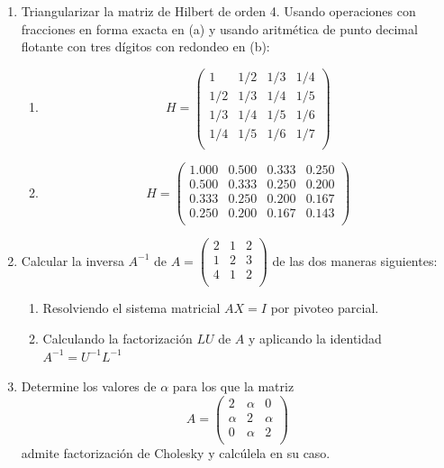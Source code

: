 \documentclass[12pt,letterpaper]{article}
\theoremstyle{plain}
\begin{document}
\begin{enumerate}
\item Triangularizar la matriz de Hilbert de orden 4. Usando operaciones con fracciones en forma exacta en (a) y usando aritm\'etica de punto decimal flotante con tres d\'igitos con redondeo en (b):
\begin{multicols}{2}
\begin{enumerate}
 \item $$
H=\left( \begin{array}{cccc}
         1   & 1/2 & 1/3 & 1/4\\
         1/2 & 1/3 & 1/4 & 1/5\\
         1/3 & 1/4 & 1/5 & 1/6\\
	 1/4 & 1/5 & 1/6 & 1/7\\
        \end{array}\right)
$$
\item $$
H=\left( \begin{array}{cccc}
         1.000   & 0.500 & 0.333 & 0.250\\
         0.500 & 0.333 & 0.250 & 0.200\\
         0.333 & 0.250 & 0.200 & 0.167\\
	 0.250 & 0.200 & 0.167 & 0.143\\
        \end{array}\right)
$$
 \end{enumerate}
\end{multicols}
\item Calcular la inversa $A^{-1}$ de $A=
\left( \begin{array}{ccc}
         2   & 1 & 2 \\
         1 & 2 & 3\\
         4 & 1 & 2\\
        \end{array}\right)
$ de las dos maneras siguientes:
\begin{enumerate}
\item Resolviendo el sistema matricial $AX = I$ por pivoteo parcial.
\item Calculando la factorizaci\'on $LU$ de $A$ y aplicando la identidad $A^{-1} = U ^{-1}L^{-1}$

\end{enumerate}
\item Determine los valores de $\alpha$ para los que la matriz
$$
A=\left( \begin{array}{ccc}
         2   & \alpha & 0\\
         \alpha & 2 & \alpha\\
         0 & \alpha & 2\\
        \end{array}\right)
$$
admite factorizaci\'on de Cholesky y calc\'ulela en su caso.


\end{enumerate}
\end{document}
